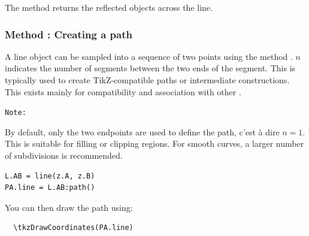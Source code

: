 The method returns the reflected objects across the line.

\vspace{1em}

\begin{tkzexample}[latex=.5\textwidth]

\begin{center}
\end{center}
\end{tkzexample}

\subsubsection{Method : Creating a path}
\label{ssub:line_path}

A line object can be sampled into a sequence of two points using the method . $n$ indicates the number of segments between the two ends of the segment. This is typically used to create TikZ-compatible paths or intermediate constructions. This 
exists mainly for compatibility and association with other .
\medskip

\texttt{Note: }

By default, only the two endpoints are used to define the path, c'est à dire $n = 1$. This is suitable for filling or clipping regions. For smooth curves, a larger number of subdivisions is recommended.

\medskip

\begin{mybox}
\begin{verbatim}
L.AB = line(z.A, z.B)
PA.line = L.AB:path()
\end{verbatim}
\end{mybox}

You can then draw the path using:

\begin{mybox}
\begin{verbatim}
  \tkzDrawCoordinates(PA.line)
\end{verbatim}
\end{mybox}

